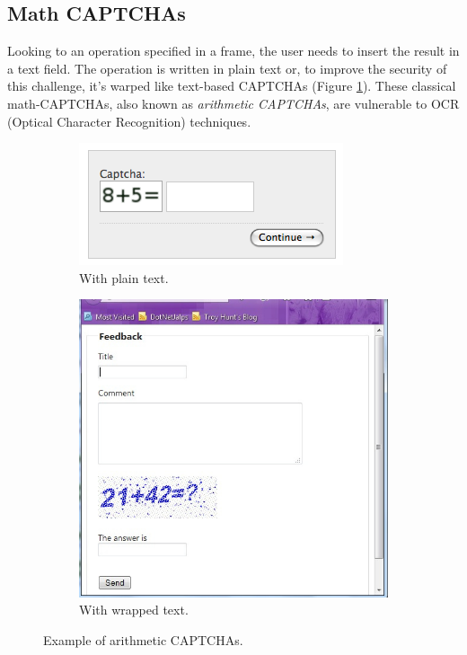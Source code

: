 \subsection{Math CAPTCHAs}
Looking to an operation specified in a frame, the user needs to insert the result in a text field. The operation is written in plain text or, to improve the security of this challenge, it's warped like text-based CAPTCHAs (Figure \ref{soa:arithmetic}). These classical math-CAPTCHAs, also known as \textit{arithmetic CAPTCHAs}, are vulnerable to OCR (Optical Character Recognition) techniques.\\
\begin{figure}[h]
     \centering
     \begin{subfigure}[b]{0.48\textwidth}
         \centering
         \includegraphics[width=.7\linewidth]{Images/StateOfArt/math_CAPTCHA}
         \caption{\footnotesize{With plain text.}}
     \end{subfigure}
     \hfill
     \begin{subfigure}[b]{0.48\textwidth}
         \centering
         \includegraphics[width=.7\textwidth]{Images/StateOfArt/math_CAPTCHA2}
         \caption{\footnotesize{With wrapped text.}}
     \end{subfigure}
		\caption{\footnotesize{Example of arithmetic CAPTCHAs.}}
		\label{soa:arithmetic}
\end{figure}
